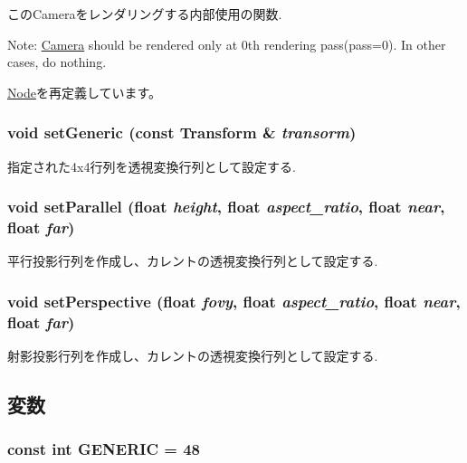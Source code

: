 このCameraをレンダリングする内部使用の関数.

Note: \hyperlink{classm3g_1_1Camera}{Camera} should be rendered only at 0th rendering pass(pass=0). In other cases, do nothing. 

\hyperlink{classm3g_1_1Node_8babc8a79b78615da51161e94029eea9}{Node}を再定義しています。\hypertarget{classm3g_1_1Camera_51c42821097e90d3f59e87676684f60a}{
\subsubsection[{setGeneric}]{\setlength{\rightskip}{0pt plus 5cm}void setGeneric (const {\bf Transform} \& {\em transorm})}}
\label{classm3g_1_1Camera_51c42821097e90d3f59e87676684f60a}


指定された4x4行列を透視変換行列として設定する. \hypertarget{classm3g_1_1Camera_cb4535fd75b28b4d58390962d0c0e588}{
\subsubsection[{setParallel}]{\setlength{\rightskip}{0pt plus 5cm}void setParallel (float {\em height}, \/  float {\em aspect\_\-ratio}, \/  float {\em near}, \/  float {\em far})}}
\label{classm3g_1_1Camera_cb4535fd75b28b4d58390962d0c0e588}


平行投影行列を作成し、カレントの透視変換行列として設定する. \hypertarget{classm3g_1_1Camera_ca92a48ebe3424deac8e54c27550189d}{
\subsubsection[{setPerspective}]{\setlength{\rightskip}{0pt plus 5cm}void setPerspective (float {\em fovy}, \/  float {\em aspect\_\-ratio}, \/  float {\em near}, \/  float {\em far})}}
\label{classm3g_1_1Camera_ca92a48ebe3424deac8e54c27550189d}


射影投影行列を作成し、カレントの透視変換行列として設定する. 

\subsection{変数}
\hypertarget{classm3g_1_1Camera_48a4e153c97a1f4890558a77dfe02ca4}{
\subsubsection[{GENERIC}]{\setlength{\rightskip}{0pt plus 5cm}const int {\bf GENERIC} = 48}}
\label{classm3g_1_1Camera_48a4e153c97a1f4890558a77dfe02ca4}


